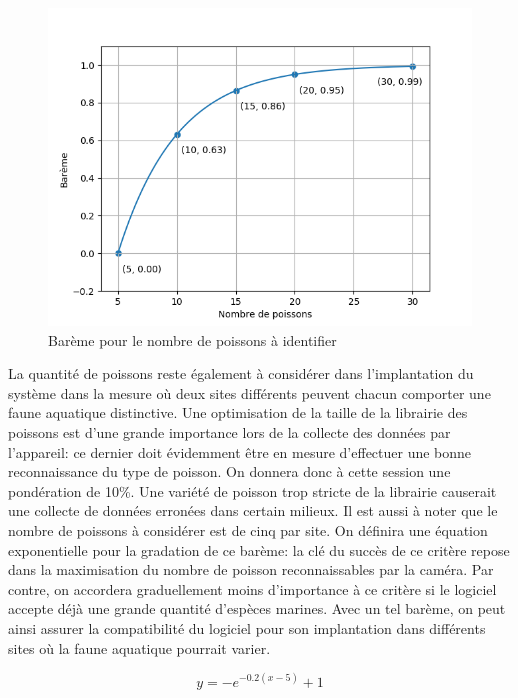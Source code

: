 \begin{figure}
    \centering
    \includegraphics[width=\linewidth]{fig/bareme_identification.png}
    \caption{Barème pour le nombre de poissons à identifier}
    \label{fig:bareme_identification}
\end{figure}

La quantité de poissons reste également à considérer dans l'implantation du système dans la mesure où deux sites différents peuvent chacun comporter une faune aquatique distinctive. Une optimisation de la taille de la librairie des poissons est d'une grande importance lors de la collecte des données par l'appareil: ce dernier doit évidemment être en mesure d'effectuer une bonne reconnaissance du type de poisson. On donnera donc à cette session une pondération de 10\%. Une variété de poisson trop stricte de la librairie causerait une collecte de données erronées dans certain milieux. Il est aussi à noter que le nombre de poissons à considérer est de cinq par site. On définira une équation exponentielle pour la gradation de ce barème: la clé du succès de ce critère repose dans la maximisation du nombre de poisson reconnaissables par la caméra. Par contre, on accordera graduellement moins d'importance à ce critère si le logiciel accepte déjà une grande quantité d'espèces marines. Avec un tel barème, on peut ainsi assurer la compatibilité du logiciel pour son implantation dans différents sites où la faune aquatique pourrait varier.

\begin{equation}
    y = -e^{-0.2(x-5)} + 1
    \label{eq:bareme_identification}
\end{equation}


